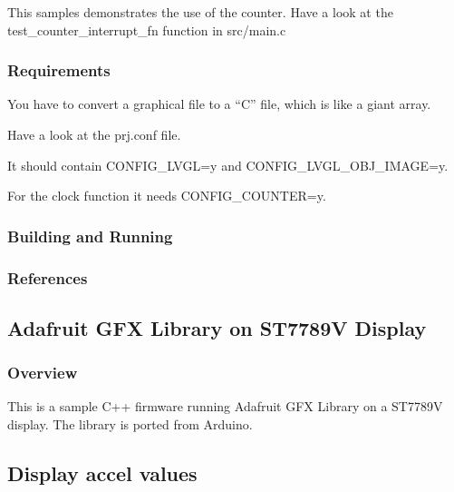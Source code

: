 \documentclass[letterpaper,10pt,english]{sphinxmanual}
\begin{document}
This samples demonstrates the use of the counter.
Have a look at the test\_counter\_interrupt\_fn function in src/main.c


\subsubsection{Requirements}
\label{\detokenize{samples/gui/clock/README:requirements}}
You have to convert a graphical file to a “C” file, which is like a giant array.

Have a look at the prj.conf file.

It should contain CONFIG\_LVGL=y and
CONFIG\_LVGL\_OBJ\_IMAGE=y.

For the clock function it needs  CONFIG\_COUNTER=y.


\subsubsection{Building and Running}
\label{\detokenize{samples/gui/clock/README:building-and-running}}

\subsubsection{References}
\label{\detokenize{samples/gui/clock/README:references}}

\subsection{Adafruit GFX Library on ST7789V Display}
\label{\detokenize{samples/gui/gfx/README:adafruit-gfx-library-on-st7789v-display}}\label{\detokenize{samples/gui/gfx/README:gfx-sample}}\label{\detokenize{samples/gui/gfx/README::doc}}

\subsubsection{Overview}
\label{\detokenize{samples/gui/gfx/README:overview}}
This is a sample C++ firmware running Adafruit GFX Library on a ST7789V display. The library is ported from Arduino.


\subsection{Display accel values}
\label{\detokenize{samples/gui/lvaccel/README:display-accel-values}}\label{\detokenize{samples/gui/lvaccel/README:lvaccel-sample}}\label{\detokenize{samples/gui/lvaccel/README::doc}}
\end{document}
